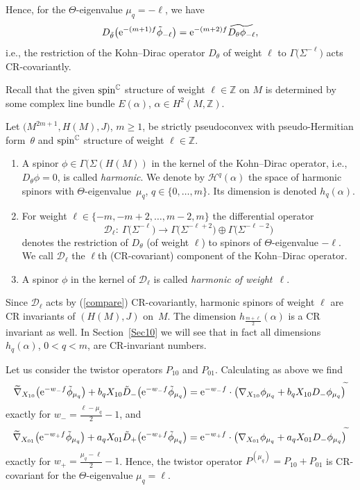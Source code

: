 \documentclass[10pt,a4paper]{amsart}
\numberwithin{equation}{section}
\newcommand{\ZZ}{\mathbb{Z}}
\newcommand{\CC}{\mathbb{C}}
\begin{document}
Hence, for the $\Theta$-eigenvalue $\mu_q=-\ell$, we have
\begin{equation}\label{compare}
D_{\tilde{\theta}}\big({\rm e}^{-(m+1)f}\tilde{\phi}_{-\ell}\big) = {\rm e}^{-(m+2)f} \widetilde{D_\theta\phi_{-\ell}},
\end{equation}
i.e., the restriction of the Kohn--Dirac operator $D_\theta$ of weight $\ell$ to $\Gamma\big(\Sigma^{-\ell}\big)$ acts CR-covariantly.

Recall that the given ${\rm spin}^\CC$ structure of weight $\ell\in\ZZ$ on $M$ is determined by some complex line bundle $E(\alpha)$, $\alpha\in H^2(M,\ZZ)$.

\begin{Definition} Let $\big(M^{2m+1},H(M),J\big)$, $m\geq 1$, be strictly pseudoconvex
with pseudo-Her\-mi\-tian form~$\theta$ and ${\rm spin}^\CC$ structure of weight $\ell\in\ZZ$.\samepage
\begin{enumerate}\itemsep=0pt
\item[(a)] A spinor $\phi\in\Gamma(\Sigma(H(M))$ in the kernel of the Kohn--Dirac operator, i.e., $D_\theta\phi=0$,
is called \emph{harmonic}. We denote by $\mathcal{H}^{q}(\alpha)$ the space of harmonic spinors
with $\Theta$-eigenvalue~$\mu_q$, $q\in\{0,\dots,m\}$. Its dimension is denoted $h_{q}(\alpha)$.
\item[(b)] For weight $\ell\in\{-m,-m+2,\dots,m-2,m\}$ the differential operator
\[
\mathcal{D}_\ell\colon \ \Gamma\big(\Sigma^{-\ell}\big) \to \Gamma\big(\Sigma^{-\ell+2}\big)\oplus\Gamma\big(\Sigma^{-\ell-2}\big)
\]
denotes the restriction of $D_\theta$ (of weight $\ell$) to spinors of $\Theta$-eigenvalue $-\ell$.
We call $\mathcal{D}_\ell$ the $\ell$th (CR-covariant) component of the Kohn--Dirac operator.
\item[(c)] A spinor $\phi$ in the kernel of $\mathcal{D}_\ell$ is called \emph{harmonic of weight~$\ell$}.
\end{enumerate}
\end{Definition}

Since $\mathcal{D}_\ell$ acts by (\ref{compare}) CR-covariantly,
harmonic spinors of weight $\ell$ are CR invariants of $(H(M),J)$ on~$M$.
The dimension $h_{\frac{m+\ell}{2}}(\alpha)$ is a CR invariant as well.
In Section~\ref{Sec10} we will see that in fact all dimensions $h_{q}(\alpha)$, $0<q<m$, are CR-invariant numbers.

Let us consider the twistor operators $P_{10}$ and $P_{01}$. Calculating as above we find
\[\widetilde{\nabla}_{X_{10}}\big({\rm e}^{-w_-f}\tilde{\phi}_{\mu_q}\big)+b_qX_{10}\tilde{D}_-\big({\rm e}^{-w_-f}\tilde{\phi}_{\mu_q}\big) =
{\rm e}^{-w_-f}\cdot\big(\nabla_{X_{10}}\phi_{\mu_q}+b_qX_{10}D_-\phi_{\mu_q}\big)^{\widetilde{}}\]
exactly for $w_-=\frac{\ell-\mu_q}{2}-1$, and
\[\widetilde{\nabla}_{X_{01}}\big({\rm e}^{-w_+f}\tilde{\phi}_{\mu_q}\big)+a_qX_{01}\tilde{D}_+\big({\rm e}^{-w_+f}\tilde{\phi}_{\mu_q}\big) =
{\rm e}^{-w_+f}\cdot\big(\nabla_{X_{01}}\phi_{\mu_q}+a_qX_{01}D_-\phi_{\mu_q}\big)^{\widetilde{}}\]
exactly for $w_+=\frac{\mu_q-\ell}{2}-1$.
Hence, the twistor operator $P^{(\mu_q)}=P_{10}+P_{01}$ is CR-covariant for the $\Theta$-eigenvalue $\mu_q=\ell$.
\end{document}
